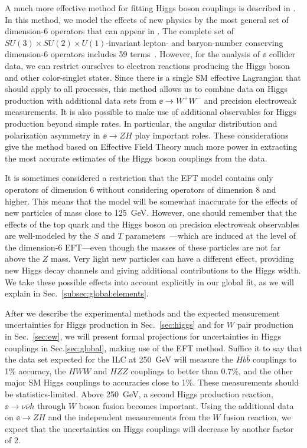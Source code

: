 A much more effective method for fitting Higgs boson couplings is described in \cite{Barklow:2017suo}.   In this method, we model the effects of new physics by the most general set of dimension-6 operators that can appear in .  The complete set of $SU(3)\times SU(2)\times U(1)$-invariant lepton- and baryon-number conserving dimension-6 operators  includes 59 terms~\cite{Grzadkowski:2010es}.  However, for 
the analysis of $\ee$ collider data, we can restrict ourselves to electron reactions 
producing the Higgs boson and other color-singlet states.  Since there is a single SM effective
 Lagrangian that should apply to all processes, this method allows us to combine data on 
Higgs production with additional data sets from $\ee\to W^+W^-$ and precision electroweak
measurements.   It is also possible to make use of additional observables for Higgs production
beyond simple rates.  In particular, the angular distribution and polarization asymmetry in 
$\ee\to ZH$ play important roles.  These considerations give the method based on 
Effective Field Theory much more power in extracting the most accurate estimates 
of the 
Higgs boson couplings from the data.

It is sometimes considered a restriction that the EFT model contains only operators of dimension 6 without considering operators of dimension 8 and higher.    This means that the model will be somewhat inaccurate for the effects of new particles of mass close to 125~GeV.  However, one should remember that the effects of the top quark and the Higgs boson on precision electroweak observables are well-modeled by the $S$ and $T$ parameters~\cite{Peskin:1990zt}---which are induced at the level of the dimension-6 EFT---even though the masses of these particles are not far above the $Z$ mass.   Very light new particles can have a different effect, providing new Higgs decay channels and giving additional contributions to the Higgs width.  We take these possible effects into account explicitly in our global fit, as we will explain in Sec.~\ref{subsec:global:elements}.

After we describe the experimental methods and the expected measurement uncertainties for Higgs production in  Sec.~\ref{sec:higgs} and for $W$ pair production in Sec.~\ref{sec:ew},  we will present formal  projections for uncertainties in 
Higgs couplings in Sec.\ref{sec:global}, making use of the EFT  method.  Suffice it to say that the data set expected for the ILC at 250~GeV will  measure the $Hb\bar b$ couplings to 1\% accuracy, the $HWW$ and $HZZ$ couplings to better than 0.7\%, and the other 
major SM Higgs couplings to accuracies close to 1\%.    These measurements should be 
statistics-limited.  Above 250~GeV, a second Higgs production reaction, $\ee\to \nu\bar\nu h$ through $W$ boson fusion becomes important.  Using the additional data on $\ee\to ZH$ and the independent measurements from the $W$ fusion reaction, we expect that the uncertainties on Higgs couplings will decrease by another factor of 2. 


